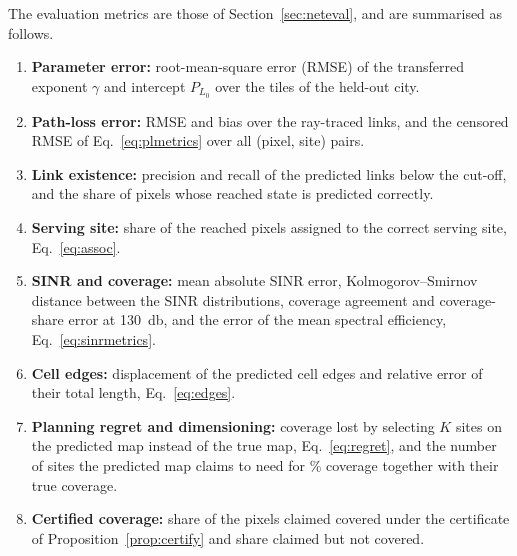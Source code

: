 The evaluation metrics are those of Section~\ref{sec:neteval}, and are
summarised as follows.
\begin{enumerate}
\item \textbf{Parameter error:} root-mean-square error (RMSE) of the
transferred exponent $\gamma$ and intercept $P_{L_0}$ over the tiles of the
held-out city.
\item \textbf{Path-loss error:} RMSE and bias over the ray-traced links, and
the censored RMSE of Eq.~\eqref{eq:plmetrics} over all (pixel, site) pairs.
\item \textbf{Link existence:} precision and recall of the predicted links
below the cut-off, and the share of pixels whose reached state is predicted
correctly.
\item \textbf{Serving site:} share of the reached pixels assigned to the
correct serving site, Eq.~\eqref{eq:assoc}.
\item \textbf{SINR and coverage:} mean absolute SINR error,
Kolmogorov--Smirnov distance between the SINR distributions, coverage
agreement and coverage-share error at \SI{130}{\decibel}, and the error of
the mean spectral efficiency, Eq.~\eqref{eq:sinrmetrics}.
\item \textbf{Cell edges:} displacement of the predicted cell edges and
relative error of their total length, Eq.~\eqref{eq:edges}.
\item \textbf{Planning regret and dimensioning:} coverage lost by selecting
$K$ sites on the predicted map instead of the true map,
Eq.~\eqref{eq:regret}, and the number of sites the predicted map claims to
need for \covTarget\% coverage together with their true coverage.
\item \textbf{Certified coverage:} share of the pixels claimed covered under
the certificate of Proposition~\ref{prop:certify} and share claimed but not
covered.
\end{enumerate}


